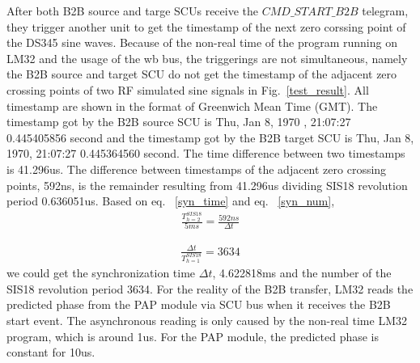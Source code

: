 After both B2B source and targe SCUs receive the $CMD\_START\_B2B$ telegram, they trigger another unit to get the timestamp of the next zero corssing point of the DS345 sine waves. Because of the non-real time of the program running on LM32 and the usage of the wb bus, the triggerings are not simultaneous, namely the B2B source and target SCU do not get the timestamp of the adjacent zero crossing points of two RF simulated sine signals in Fig.~\ref{test_result}. All timestamp are shown in the format of Greenwich Mean Time (GMT). The timestamp got by the B2B source SCU is Thu, Jan 8, 1970 , 21:07:27 0.445405856 second and the timestamp got by the B2B target SCU is Thu, Jan 8, 1970, 21:07:27 0.445364560 second. The time difference between two timestamps is 41.296us. The difference between timestamps of the adjacent zero crossing points, 592ns, is the remainder resulting from 41.296us dividing SIS18 revolution period 0.636051us. Based on eq. ~\ref{syn_time} and eq. ~\ref{syn_num}, 
\begin{equation}
\begin{aligned}
\frac{T^{SIS18}_{h=2}}{5ms}=\frac{592ns}{\Delta t}
\label {syn_time}
\end{aligned}
\end{equation}

\begin{equation}
\begin{aligned}
\frac{\Delta t}{T^{SIS18}_{h=1}}=3634
\label {syn_num}
\end{aligned}
\end{equation}
we could get the synchronization time $\Delta t$, 4.622818ms and the number of the SIS18 revolution period 3634. For the reality of the B2B transfer, LM32 reads the predicted phase from the PAP module via SCU bus when it receives the B2B start event. The asynchronous reading is only caused by the non-real time LM32 program, which is around 1us. For the PAP module, the predicted phase is constant for 10us.          



